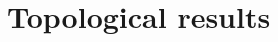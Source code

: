 \documentclass{beamer}
\newtheorem{remark}{Remark}
\begin{document}
\section{Topological results} %
%
\end{document}
